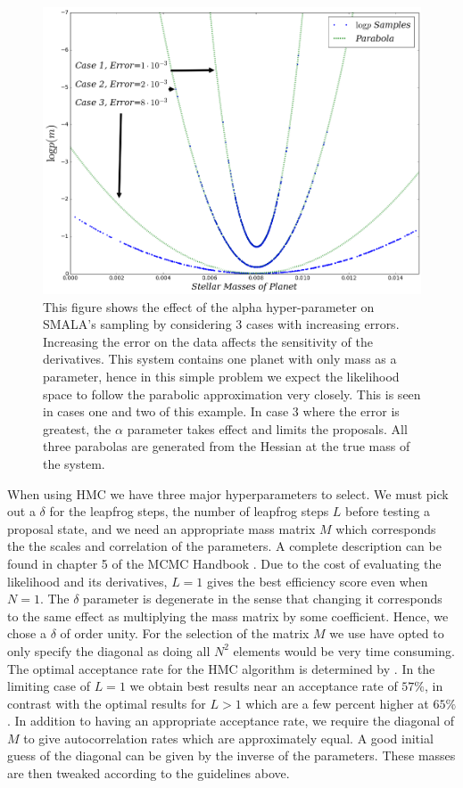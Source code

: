 \documentclass{aa}
\begin{document}
\begin{figure}
\centering
\includegraphics[width=0.95\hsize]{alpha-1.png}
   \caption{This figure shows the effect of the alpha hyper-parameter on SMALA's sampling by considering 3 cases with increasing errors. 
Increasing the error on the data affects the sensitivity of the derivatives. 
This system contains one planet with only mass as a parameter, hence in this simple problem we expect the likelihood space to follow the parabolic approximation very closely. 
This is seen in cases one and two of this example. 
In case 3 where the error is greatest, the $\alpha$ parameter takes effect and limits the proposals. 
All three parabolas are generated from the Hessian at the true mass of the system.}
      \label{alpha}
\end{figure}

When using HMC we have three major hyperparameters to select. 
We must pick out a $\delta$ for the leapfrog steps, the number of leapfrog steps $L$ before testing a proposal state, and we need an appropriate mass matrix $M$ which corresponds the the scales and correlation of the parameters. 
A complete description can be found in chapter 5 of the MCMC Handbook \cite{1206.1901}. 
Due to the cost of evaluating the likelihood and its derivatives, $L=1$ gives the best efficiency score even when $N=1$. 
The $\delta$ parameter is degenerate in the sense that changing it corresponds to the same effect as multiplying the mass matrix by some coefficient.
Hence, we chose a $\delta$ of order unity. 
For the selection of the matrix $M$ we use have opted to only specify the diagonal as doing all $N^2$ elements would be very time consuming.
The optimal acceptance rate for the HMC algorithm is determined by \cite{1001.4460}. 
In the limiting case of $L=1$ we obtain best results near an acceptance rate of $57\%$, in contrast with the optimal results for $L>1$ which are a few percent higher at $65\%$. 
In addition to having an appropriate acceptance rate, we require the diagonal of $M$ to give autocorrelation rates which are approximately equal.
A good initial guess of the diagonal can be given by the inverse of the parameters. 
These masses are then tweaked according to the guidelines above.
\end{document}
